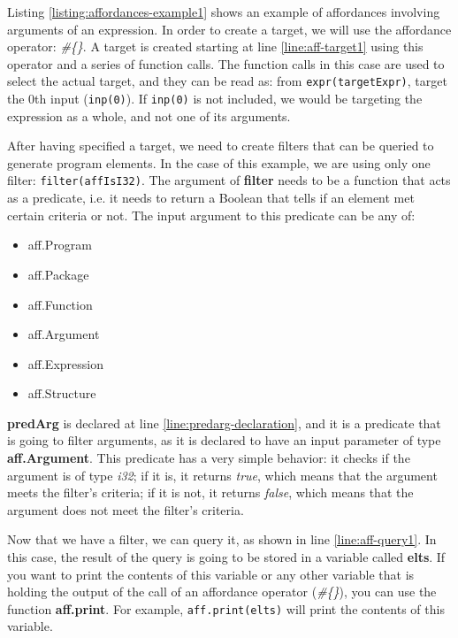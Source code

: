 \documentclass[11pt,fleqn,openany]{book} %
\begin{document}
Listing \ref{listing:affordances-example1} shows an example of affordances involving arguments of an expression. In order to create a target, we will use the affordance operator: \emph{\#\{\}}. A target is created starting at line \ref{line:aff-target1} using this operator and a series of function calls. The function calls in this case are used to select the actual target, and they can be read as: from \lstinline{expr(targetExpr)}, target the 0th input (\lstinline{inp(0)}). If \lstinline{inp(0)} is not included, we would be targeting the expression as a whole, and not one of its arguments.

After having specified a target, we need to create filters that can be queried to generate program elements. In the case of this example, we are using only one filter: \lstinline{filter(affIsI32)}. The argument of \textbf{filter} needs to be a function that acts as a predicate, i.e. it needs to return a Boolean that tells if an element met certain criteria or not. The input argument to this predicate can be any of:

\begin{itemize}
    \item aff.Program
    \item aff.Package
    \item aff.Function
    \item aff.Argument
    \item aff.Expression
    \item aff.Structure
\end{itemize}

\textbf{predArg} is declared at line \ref{line:predarg-declaration}, and it is a predicate that is going to filter arguments, as it is declared to have an input parameter of type \textbf{aff.Argument}. This predicate has a very simple behavior: it checks if the argument is of type \emph{i32}; if it is, it returns \emph{true}, which means that the argument meets the filter's criteria; if it is not, it returns \emph{false}, which means that the argument does not meet the filter's criteria.

Now that we have a filter, we can query it, as shown in line \ref{line:aff-query1}. In this case, the result of the query is going to be stored in a variable called \textbf{elts}. If you want to print the contents of this variable or any other variable that is holding the output of the call of an affordance operator (\emph{\#\{\}}), you can use the function \textbf{aff.print}. For example, \lstinline{aff.print(elts)} will print the contents of this variable.
\end{document}
